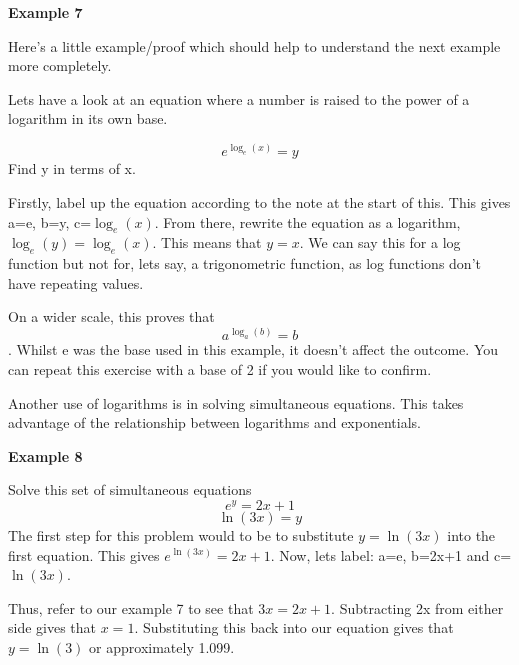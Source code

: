 \documentclass[
  12pt,
  a4paper, oneside]{starmastarticle}
\begin{document}
\begin{tcolorbox}[enhanced jigsaw, leftrule=.75mm, rightrule=.15mm, breakable, left=2mm, colback=white, bottomrule=.15mm, arc=.35mm, toprule=.15mm, opacityback=0, colframe=quarto-callout-note-color-frame]
\begin{minipage}[t]{5.5mm}
\textcolor{quarto-callout-note-color}{\faInfo}
\end{minipage}%
\begin{minipage}[t]{\textwidth - 5.5mm}

\textbf{Example 7}\vspace{2mm}

Here's a little example/proof which should help to understand the next
example more completely.

Lets have a look at an equation where a number is raised to the power of
a logarithm in its own base.

\[e^{\log_e(x)}=y\] Find y in terms of x.

Firstly, label up the equation according to the note at the start of
this. This gives a=e, b=y, c=\(\log_e(x)\). From there, rewrite the
equation as a logarithm, \(\log_e(y)=\log_e(x)\). This means that
\(y=x\). We can say this for a log function but not for, lets say, a
trigonometric function, as log functions don't have repeating values.

On a wider scale, this proves that \[a^{\log_a(b)}=b\]. Whilst e was the
base used in this example, it doesn't affect the outcome. You can repeat
this exercise with a base of 2 if you would like to confirm.

\end{minipage}%
\end{tcolorbox}

Another use of logarithms is in solving simultaneous equations. This
takes advantage of the relationship between logarithms and exponentials.

\begin{tcolorbox}[enhanced jigsaw, leftrule=.75mm, rightrule=.15mm, breakable, left=2mm, colback=white, bottomrule=.15mm, arc=.35mm, toprule=.15mm, opacityback=0, colframe=quarto-callout-note-color-frame]
\begin{minipage}[t]{5.5mm}
\textcolor{quarto-callout-note-color}{\faInfo}
\end{minipage}%
\begin{minipage}[t]{\textwidth - 5.5mm}

\textbf{Example 8}\vspace{2mm}

Solve this set of simultaneous equations \[e^y=2x+1\] \[\ln(3x)=y\] The
first step for this problem would to be to substitute \(y=\ln(3x)\) into
the first equation. This gives \(e^{\ln(3x)}=2x+1\). Now, lets label:
a=e, b=2x+1 and c=\(\ln(3x)\).

Thus, refer to our example 7 to see that \(3x=2x+1\). Subtracting 2x
from either side gives that \(x=1\). Substituting this back into our
equation gives that \(y=\ln(3)\) or approximately 1.099.

\end{minipage}%
\end{tcolorbox}
\end{document}
